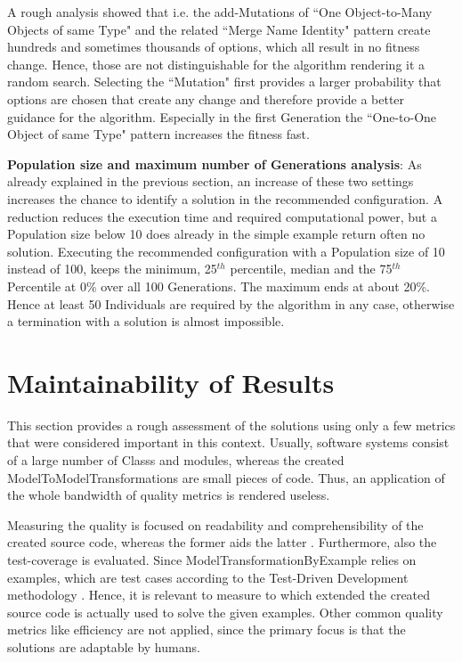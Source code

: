 A rough analysis showed that i.e. the add-\glspl{Mutation} of ``One Object-to-Many Objects of same Type" and the related ``Merge Name Identity" pattern create hundreds and sometimes thousands of options, which all result in no fitness change. Hence, those are not distinguishable for the algorithm rendering it a random search. Selecting the ``Mutation" first provides a larger probability that options are chosen that create any change and therefore provide a better guidance for the algorithm. Especially in the first \gls{Generation} the ``One-to-One Object of same Type" pattern increases the fitness fast. 


\textbf{\Gls{Population} size and maximum number of \glspl{Generation} analysis}: As already explained in the previous section, an increase of these two settings increases the chance to identify a solution in the recommended configuration. A reduction reduces the execution time and required computational power, but a \Gls{Population} size below 10 does already in the simple example return often no solution. Executing the recommended configuration with a \gls{Population} size of 10 instead of 100, keeps the minimum, 25$^{th}$ percentile, median and the 75$^{th}$ Percentile at 0\% over all 100 \glspl{Generation}. The maximum ends at about 20\%. Hence at least 50 \glspl{Individual} are required by the algorithm in any case, otherwise a termination with a solution is almost impossible.

\section{Maintainability of Results}
\label{secMaintainabilityOfResults}

This section provides a rough assessment of the solutions using only a few metrics that were considered important in this context. Usually, software systems consist of a large number of \glspl{Class} and modules, whereas the created \glspl{ModelToModelTransformation} are small pieces of code. Thus, an application of the whole bandwidth of quality metrics is rendered useless.

Measuring the quality is focused on readability and comprehensibility of the created source code, whereas the former aids the latter \cite{Buse2008}. Furthermore, also the test-coverage is evaluated. Since \gls{ModelTransformationByExample} relies on examples, which are test cases according to the Test-Driven Development methodology \cite{Beck2002}. Hence, it is relevant to measure to which extended the created source code is actually used to solve the given examples. Other common quality metrics like efficiency are not applied, since the primary focus is that the solutions are adaptable by humans.

